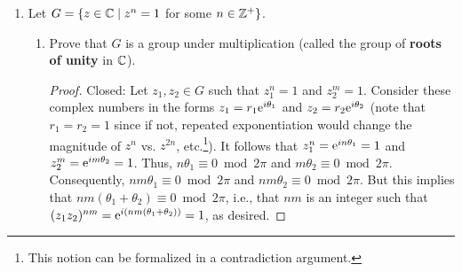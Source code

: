 \documentclass[../notes.tex]{subfiles}
\begin{document}
\begin{enumerate}[label={\textbf{\arabic*.}}]
\begin{enumerate}[label={\textbf{(\alph*)}}]
\begin{proof}[Answer]
            No.\par
            Not closed: $|\frac{2}{3}+\frac{2}{3}|=|\frac{4}{3}|\geq 1$, for instance.
        \end{proof}
        \item The set of rational numbers of absolute value $\geq 1$ together with 0.
        \begin{proof}[Answer]
            No.\par
            Not closed: $|\frac{3}{2}+(-\frac{1}{1})|=|-\frac{1}{2}|=\frac{1}{2}<1$, for instance.
        \end{proof}
        \item The set of rational numbers with denominators equal to 1 or 2.
        \begin{proof}[Answer]
            Yes.\par
            Closed: $\lcm(1,1)=1$, $\lcm(1,2)=2$, and $\lcm(2,2)=2$, so the denominator stays within the constraints of the set.\par
            Axioms (i-iii): Symmetric to (a).
        \end{proof}
        \item The set of rational numbers with denominators equal to 1, 2, or 3.
        \begin{proof}[Answer]
            No.\par
            Not closed: $\lcm(2,3)=6\notin\{1,2,3\}$, so $\frac{1}{2}+\frac{1}{3}=\frac{5}{6}$, for instance.
        \end{proof}
    \end{enumerate}
    \item Let $G=\{z\in\C\mid z^n=1$ for some $n\in\Z^+\}$.
    \begin{enumerate}[label={\textbf{(\alph*)}}]
        \item Prove that $G$ is a group under multiplication (called the group of \textbf{roots of unity} in $\C$).
        \begin{proof}
            Closed: Let $z_1,z_2\in G$ such that $z_1^n=1$ and $z_2^m=1$. Consider these complex numbers in the forms $z_1=r_1\e[i\theta_1]$ and $z_2=r_2\e[i\theta_2]$ (note that $r_1=r_2=1$ since if not, repeated exponentiation would change the magnitude of $z^n$ vs. $z^{2n}$, etc.\footnote{This notion can be formalized in a contradiction argument.}). It follows that $z_1^n=\e[in\theta_1]=1$ and $z_2^m=\e[im\theta_2]=1$. Thus, $n\theta_1\equiv 0\bmod 2\pi$ and $m\theta_2\equiv 0\bmod 2\pi$. Consequently, $nm\theta_1\equiv 0\bmod 2\pi$ and $nm\theta_2\equiv 0\bmod 2\pi$. But this implies that $nm(\theta_1+\theta_2)\equiv 0\bmod 2\pi$, i.e., that $nm$ is an integer such that $(z_1z_2)^{nm}=\e[i(nm(\theta_1+\theta_2))]=1$, as desired.\par

\end{proof}
\end{enumerate}
\end{enumerate}
\end{document}

